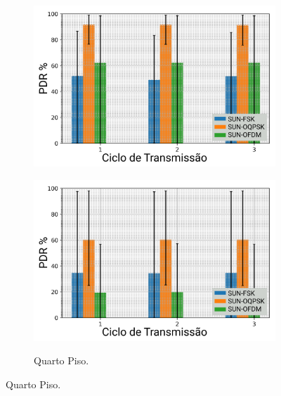 \begin{figure}[ht!]
\begin{subfigure}{.4\textwidth}
            \includegraphics[width=\textwidth]{./sections/textual/chapters/images/mod_3_floor.png}
            \label{fig:piso3}
      \end{subfigure}
      \begin{subfigure}{.4\textwidth}
            \centering
            \caption{Quarto Piso.}
            \includegraphics[width=\textwidth]{./sections/textual/chapters/images/mod_4_floor.png}
            \label{fig:piso4}
      \end{subfigure}
      \label{fig:pdr_andar}
\end{figure}




